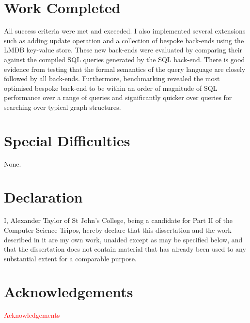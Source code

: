 \documentclass[12pt,a4paper,twoside,openright]{report}
\newcommand\todo[1]{\textcolor{red}{#1}}
\begin{document}
\section*{Work Completed}


All success criteria were met and exceeded. I also implemented several extensions such as adding update operation and a collection of bespoke back-ends using the LMDB key-value store. These new back-ends were evaluated by comparing their against the compiled SQL queries generated by the SQL back-end. There is good evidence from testing that the formal semantics of the query language are closely followed by all back-ends. Furthermore, benchmarking revealed the most optimised bespoke back-end to be within an order of magnitude of SQL performance over a range of queries and significantly quicker over queries for searching over typical graph structures.

\section*{Special Difficulties}

None.
 
\newpage
\section*{Declaration}

I, Alexander Taylor of St John's College, being a candidate for Part II of the Computer
Science Tripos, hereby declare
that this dissertation and the work described in it are my own work,
unaided except as may be specified below, and that the dissertation
does not contain material that has already been used to any substantial
extent for a comparable purpose.

\bigskip
{}

\medskip
{}

\tableofcontents

\listoffigures

\newpage
\section*{Acknowledgements}

\todo{Acknowledgements}

\end{document}
